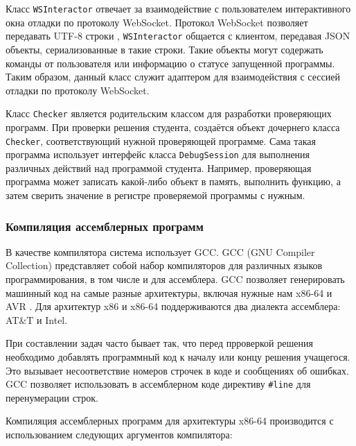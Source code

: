 \documentclass[a4paper,article,14pt]{extarticle}
\begin{document}
Класс \texttt{WSInteractor} отвечает за взаимодействие с пользователем интерактивного окна отладки по протоколу WebSocket. Протокол WebSocket позволяет передавать UTF-8 строки \cite{websocketrfc}, \texttt{WSInteractor} общается с клиентом, передавая JSON объекты, сериализованные в такие строки. Такие объекты могут содержать команды от пользователя или информацию о статусе запущенной программы. Таким образом, данный класс служит адаптером для взаимодействия с сессией отладки по протоколу WebSocket.

Класс \texttt{Checker} является родительским классом для разработки проверяющих программ. При проверки решения студента, создаётся объект дочернего класса \texttt{Checker}, соответствующий нужной проверяющей программе. Сама такая программа использует интерфейс класса \texttt{DebugSession} для выполнения различных действий над программой студента. Например, проверяющая программа может записать какой-либо объект в память, выполнить функцию, а затем сверить значение в регистре проверяемой программы с нужным.

\subsubsection{Компиляция ассемблерных программ}

В качестве компилятора система использует GCC. GCC (GNU Compiler Collection) представляет собой набор компиляторов для различных языков программирования, в том числе и для ассемблера. GCC позволяет генерировать машинный код на самые разные архитектуры, включая нужные нам x86-64 и AVR \cite{gcc}. Для архитектур x86 и x86-64 поддерживаются два диалекта ассемблера: AT\&T и Intel.

При составлении задач часто бывает так, что перед прроверкой решения необходимо добавлять программный код к началу или концу решения учащегося. Это вызывает несоответствие номеров строчек в коде и сообщениях об ошибках. GCC позволяет использовать в ассемблерном коде директиву \texttt{\#line} для перенумерации строк.

Компиляция ассемблерных программ для архитектуры x86-64 производится с использованием следующих аргументов компилятора:
\end{document}
